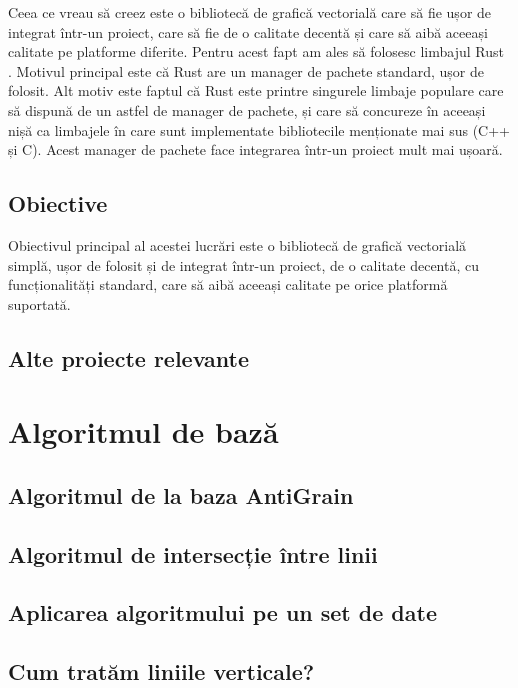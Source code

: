 \documentclass[a4paper, 12pt]{report}
\begin{document}
Ceea ce vreau să creez este o bibliotecă de grafică vectorială care să fie ușor de integrat într-un proiect,
care să fie de o calitate decentă și care să aibă aceeași calitate pe platforme diferite.
Pentru acest fapt am ales să folosesc limbajul Rust \cite{rust_lang}. Motivul principal este că Rust are un manager
de pachete standard, ușor de folosit. Alt motiv este faptul că Rust este printre singurele limbaje populare care să
dispună de un astfel de manager de pachete, și care să concureze în aceeași nișă ca limbajele în care sunt implementate
bibliotecile menționate mai sus (C++ și C). Acest manager de pachete face integrarea într-un proiect mult mai ușoară.

\section{Obiective}

Obiectivul principal al acestei lucrări este o bibliotecă de grafică vectorială simplă, ușor de folosit și de integrat
într-un proiect, de o calitate decentă, cu funcționalități standard, care să aibă aceeași calitate pe orice platformă
suportată.

\section{Alte proiecte relevante}

\chapter{Algoritmul de bază}

\section{Algoritmul de la baza AntiGrain}

\section{Algoritmul de intersecție între linii}

\section{Aplicarea algoritmului pe un set de date}

\section{Cum tratăm liniile verticale?}
\end{document}
